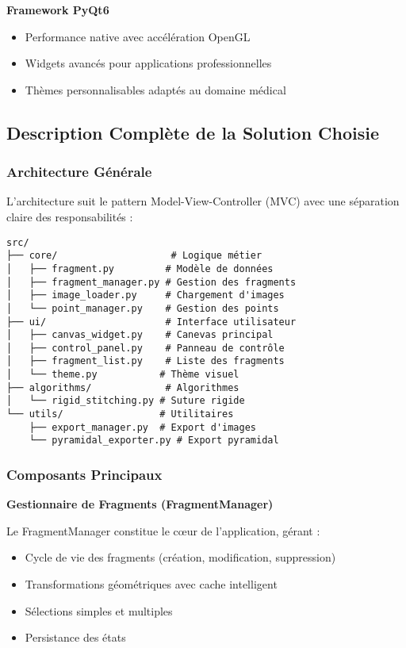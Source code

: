 \documentclass[12pt,a4paper]{article}
\begin{document}
\textbf{Framework PyQt6}
\begin{itemize}
\item Performance native avec accélération OpenGL
\item Widgets avancés pour applications professionnelles
\item Thèmes personnalisables adaptés au domaine médical
\end{itemize}

\subsection{Description Complète de la Solution Choisie}

\subsubsection{Architecture Générale}

L'architecture suit le pattern Model-View-Controller (MVC) avec une séparation claire des responsabilités :

\begin{verbatim}
src/
├── core/                    # Logique métier
│   ├── fragment.py         # Modèle de données
│   ├── fragment_manager.py # Gestion des fragments
│   ├── image_loader.py     # Chargement d'images
│   └── point_manager.py    # Gestion des points
├── ui/                     # Interface utilisateur
│   ├── canvas_widget.py    # Canevas principal
│   ├── control_panel.py    # Panneau de contrôle
│   ├── fragment_list.py    # Liste des fragments
│   └── theme.py           # Thème visuel
├── algorithms/             # Algorithmes
│   └── rigid_stitching.py # Suture rigide
└── utils/                 # Utilitaires
    ├── export_manager.py  # Export d'images
    └── pyramidal_exporter.py # Export pyramidal
\end{verbatim}

\subsubsection{Composants Principaux}

\textbf{Gestionnaire de Fragments (FragmentManager)}

Le FragmentManager constitue le cœur de l'application, gérant :
\begin{itemize}
\item Cycle de vie des fragments (création, modification, suppression)
\item Transformations géométriques avec cache intelligent
\item Sélections simples et multiples
\item Persistance des états
\end{itemize}
\end{document}
